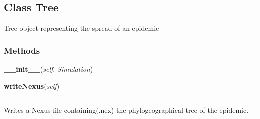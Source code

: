 \subsection{Class Tree}

    \label{Epigrass:manager:Tree}
Tree object representing the spread of an epidemic



  \subsubsection{Methods}

    \label{Epigrass:manager:Tree:__init__}

    \vspace{0.5ex}

    \begin{boxedminipage}{\textwidth}

    \raggedright \textbf{\_\_init\_\_}(\textit{self}, \textit{Simulation})

    \end{boxedminipage}

    \label{Epigrass:manager:Tree:writeNexus}

    \vspace{0.5ex}

    \begin{boxedminipage}{\textwidth}

    \raggedright \textbf{writeNexus}(\textit{self})

    \vspace{-1.5ex}

    \rule{\textwidth}{0.5\fboxrule}
    Writes a Nexus file containing(.nex) the phylogeographical tree of the 
    epidemic.

    \vspace{1ex}

    \end{boxedminipage}

    \label{Epigrass:manager:Tree:getVenn}

